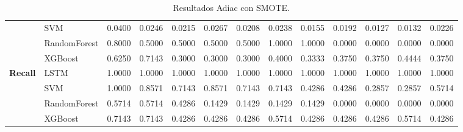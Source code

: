 \begin{table}[h]
\begin{adjustbox}{max width=15cm}
\begin{tabular}{|c|l|r|r|r|r|r|r|r|r|r|r|r|}
			& SVM &  0.0400 &  0.0246 &  0.0215 &  0.0267 &  0.0208 &  0.0238 &  0.0155 &  0.0192 &  0.0127 &  0.0132 &  0.0226 \\
			& RandomForest &  0.8000 &  0.5000 &  0.5000 &  0.5000 &  0.5000 &  1.0000 &  1.0000 &  0.0000 &  0.0000 &  0.0000 &  0.0000 \\
			& XGBoost &  0.6250 &  0.7143 &  0.3000 &  0.3000 &  0.3000 &  0.4000 &  0.3333 &  0.3750 &  0.3750 &  0.4444 &  0.3750 \\
			\hline
			\textbf{Recall} & LSTM &  1.0000 &  1.0000 &  1.0000 &  1.0000 &  1.0000 &  1.0000 &  1.0000 &  1.0000 &  1.0000 &  1.0000 &  1.0000 \\
			& SVM &  1.0000 &  0.8571 &  0.7143 &  0.8571 &  0.7143 &  0.7143 &  0.4286 &  0.4286 &  0.2857 &  0.2857 &  0.5714 \\
			& RandomForest &  0.5714 &  0.5714 &  0.4286 &  0.1429 &  0.1429 &  0.1429 &  0.1429 &  0.0000 &  0.0000 &  0.0000 &  0.0000 \\
			& XGBoost &  0.7143 &  0.7143 &  0.4286 &  0.4286 &  0.4286 &  0.5714 &  0.4286 &  0.4286 &  0.4286 &  0.5714 &  0.4286 \\
			\hline
		\end{tabular}
	\end{adjustbox}
	\caption{Resultados Adiac con SMOTE.}
	\label{tab:Adiac_SMOTE}
\end{table}
\newpage
